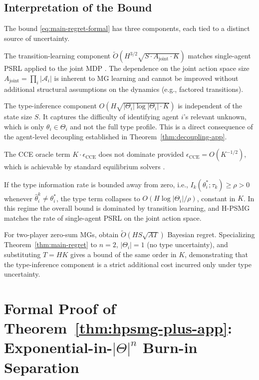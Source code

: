 \subsection{Interpretation of the Bound}

The bound \eqref{eq:main-regret-formal} has three components, each tied to a distinct source of uncertainty.

The transition-learning component $\tilde{O}(H^{3/2}\sqrt{S \cdot A_{\mathrm{joint}} \cdot K})$ matches single-agent PSRL applied to the joint MDP \citep{osband2013more}. The dependence on the joint action space size $A_{\mathrm{joint}} = \prod_i |\mathcal{A}_i|$ is inherent to MG learning and cannot be improved without additional structural assumptions on the dynamics (e.g., factored transitions).

The type-inference component $O(H\sqrt{|\Theta_i| \log|\Theta_i| \cdot K})$ is independent of the state size $S$. It captures the difficulty of identifying agent $i$'s relevant unknown, which is only $\theta_i \in \Theta_i$ and not the full type profile. This is a direct consequence of the agent-level decoupling established in Theorem~\ref{thm:decoupling-app}.

The CCE oracle term $K \cdot \epsilon_{\mathrm{CCE}}$ does not dominate provided $\epsilon_{\mathrm{CCE}} = O(K^{-1/2})$, which is achievable by standard equilibrium solvers \citep{jin2021v}.

\begin{remark}
If the type information rate is bounded away from zero, i.e., $I_k(\theta_i^*; \tau_k) \geq \rho > 0$ whenever $\hat{\theta}_i^k \neq \theta_i^*$, the type term collapses to $O(H \log|\Theta_i| / \rho)$, constant in $K$. In this regime the overall bound is dominated by transition learning, and H-PSMG matches the rate of single-agent PSRL on the joint action space.
\end{remark}

\begin{remark}
For two-player zero-sum MGs, \citet{jafarnia2021learning} obtain $\tilde{O}(HS\sqrt{AT})$ Bayesian regret. Specializing Theorem~\ref{thm:main-regret} to $n=2$, $|\Theta_i| = 1$ (no type uncertainty), and substituting $T = HK$ gives a bound of the same order in $K$, demonstrating that the type-inference component is a strict additional cost incurred only under type uncertainty.
\end{remark}

\section[Formal Proof of the Exponential-in-Theta-n Burn-in Separation Theorem]{Formal Proof of Theorem~\ref{thm:hpsmg-plus-app}: Exponential-in-\texorpdfstring{$|\Theta|^n$}{|Theta|\^n} Burn-in Separation}
\label{app:hpsmg-plus}

